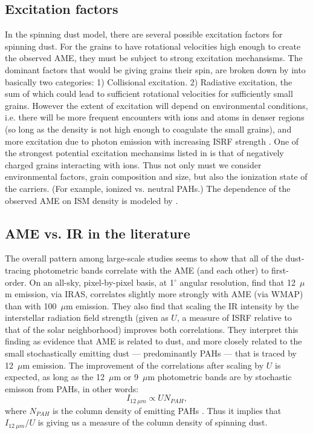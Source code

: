      \subsection{Excitation factors}
       In the spinning dust model, there are several possible excitation factors for spinning dust. For the grains to have rotational velocities high enough to create the observed AME, they must be subject to strong excitation mechansisms. The dominant factors that would be giving grains their spin, are broken down by \cite{draine11} into basically two categories: 1) Collisional excitation. 2) Radiative excitation, the sum of which could lead to sufficient rotational velocities for sufficiently small grains. However the extent of excitation will depend on environmental conditions, i.e. there will be more frequent encounters with ions and atoms in denser regions (so long as the density is not high enough to coagulate the small grains), and more excitation due to photon emission with increasing ISRF strength \citep{ali-haimoud09, ali-haimoud14}. One of the strongest potential excitation mechansims listed in \cite{draine11} is that of negatively charged grains interacting with ions. Thus not only must we consider environmental factors, grain composition and size, but also the ionization state of the carriers. (For example, ionized vs. neutral PAHs.) The dependence of the observed AME on ISM density is modeled by \cite{ali-haimoud10}.

       \subsection{AME vs. IR in the literature}
          The overall pattern among large-scale studies seems to show that all of the dust-tracing photometric bands correlate with the AME (and each other) to first-order.  On an all-sky, pixel-by-pixel basis, at 1$^{\circ}$ angular resolution, \cite{ysard10b} find that 12~$\mu$m emission, via IRAS, correlates slightly more strongly with AME (via WMAP) than with 100~$\mu$m emission.  They also find that scaling the IR intensity by the interstellar radiation field strength (given as $U$, a measure of ISRF relative to that of the solar neighborhood) improves both correlations. They interpret this finding as evidence that AME is related to dust, and more closely related to the small stochastically emitting dust --- predominantly PAHs --- that is traced by 12~$\mu$m emission. The improvement of the correlations after scaling by $U$ is expected, as long as the 12~$\mu$m or 9~$\mu$m photometric bands are by stochastic emisson from PAHs, in other words:
          \begin{equation}
            I_{12~\mu{}m} \propto{} UN_{PAH},
          \end{equation}
          where $N_{PAH}$ is the column density of emitting PAHs \citep{onaka00}. Thus it implies that $I_{12~\mu{}m}/U$ is giving us a measure of the column density of spinning dust.


